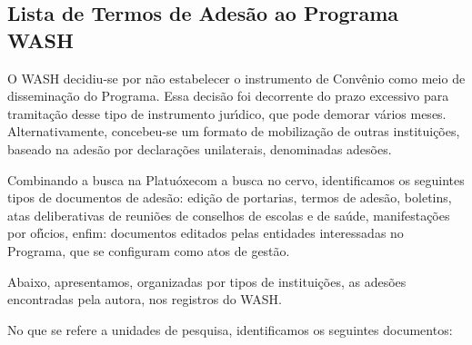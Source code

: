 \documentclass[
12pt,		%
openright,	%
twoside,  %
a4paper,			%
chapter=TITLE,		%
english,			%
french,				%
spanish,			%
brazil				%
]{USPSC-classe/USPSC}
\begin{document}
\subsection[Lista de Termos de Ades\~ao ao Programa WASH]{Lista de Termos de Ades\~ao ao Programa WASH}\label{Lista de Termos de Ades\~ao ao Programa WASH}
O WASH decidiu-se por n\~ao estabelecer o instrumento de Conv\^enio como meio de dissemina\c{c}\~ao do Programa. Essa decis\~ao foi decorrente do prazo excessivo para tramita\c{c}\~ao desse tipo de instrumento jur\'{\i}dico, que pode demorar v\'arios meses. Alternativamente, concebeu-se um formato de mobiliza\c{c}\~ao de outras institui\c{c}\~oes, baseado na ades\~ao por declara\c{c}\~oes  unilaterais, denominadas \textquotedbl ades\~oes\textquotedbl .









Combinando a busca na \textquotedbl Platu\'oxe\textquotedbl  com a busca no cervo, identificamos os seguintes tipos de documentos de ades\~ao:  edi\c{c}\~ao de portarias, termos de ades\~ao, boletins, atas deliberativas de reuni\~oes de conselhos de escolas e de sa\'ude, manifesta\c{c}\~oes por of\'{\i}cios, enfim: documentos editados pelas entidades interessadas no Programa, que se configuram como atos de gest\~ao.









Abaixo, apresentamos, organizadas por tipos de institui\c{c}\~oes, as ades\~oes encontradas pela autora, nos registros do WASH.









No que se refere a \textquotedbl unidades de pesquisa\textquotedbl , identificamos os seguintes documentos:
\end{document}
